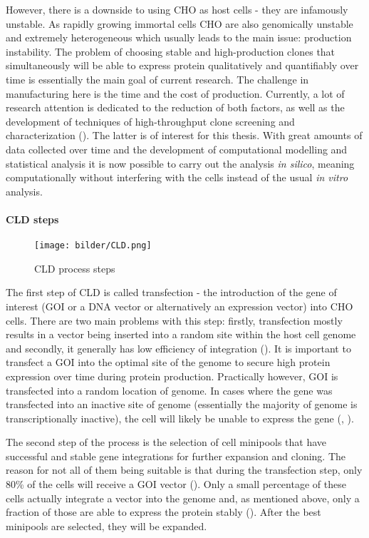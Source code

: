However, there is a downside to using CHO as host cells - they are infamously unstable. As rapidly growing immortal cells CHO are also genomically unstable and extremely heterogeneous which usually leads to the main issue: production instability. The problem of choosing stable and high-production clones that simultaneously will be able to express protein qualitatively and quantifiably over time is essentially the main goal of current research. The challenge in manufacturing here is the time and the cost of production. Currently, a lot of research attention is dedicated to the reduction of both factors, as well as the development of techniques of high-throughput clone screening and characterization (\cite{Tihanyi_2020}). The latter is of interest for this thesis. With great amounts of data collected over time and the development of computational modelling and statistical analysis it is now possible to carry out the analysis \textit{in silico}, meaning computationally without interfering with the cells instead of the usual \textit{in vitro} analysis.

\paragraph{CLD steps}
\label{section:cld-steps}
\begin{figure}[H]
	\begin{center}
		\texttt{[image: bilder/CLD.png]}
		\caption{CLD process steps}\label{fig:cls-steps}
	\end{center}
\end{figure}

The first step of CLD is called transfection - the introduction of the gene of interest (GOI or a DNA vector or alternatively an expression vector) into CHO cells. There are two main problems with this step: firstly, transfection mostly results in a vector being inserted into a random site within the host cell genome and secondly, it generally has low efficiency of integration  (\cite{Tihanyi_2020}). It is important to transfect a GOI into the optimal site of the genome to secure high protein expression over time during protein production. Practically however, GOI is transfected into a random location of genome. In cases where the gene was transfected into an inactive site of genome (essentially the majority of genome is transcriptionally inactive), the cell will likely be unable to express the gene (\cite{Castan_2018}, \cite{Hong_2018}).

The second step of the process is the selection of cell minipools that have successful and stable gene integrations for further expansion and cloning. The reason for not all of them being suitable is that during the transfection step, only 80\% of the cells will receive a GOI vector (\cite{Castan_2018}). Only a small percentage of these cells actually integrate a vector into the genome and, as mentioned above, only a fraction of those are able to express the protein stably (\cite{Shin_2020}). After the best minipools are selected, they will be expanded.

